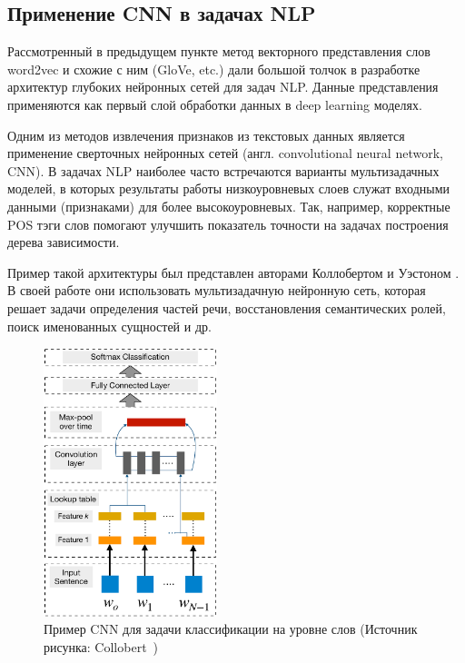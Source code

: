 \subsection{Применение CNN в задачах NLP}
Рассмотренный в предыдущем пункте метод векторного представления слов word2vec и схожие с ним (GloVe, etc.) дали большой толчок в разработке архитектур глубоких нейронных сетей для задач NLP. Данные представления применяются  как первый слой обработки данных в deep learning моделях. 

Одним из методов извлечения признаков из текстовых данных является применение сверточных нейронных сетей (англ. convolutional neural network, CNN).
В задачах NLP наиболее часто встречаются варианты мультизадачных моделей, в которых результаты работы низкоуровневых слоев служат входными данными (признаками) для более высокоуровневых. Так, например, корректные POS тэги слов помогают улучшить показатель точности на задачах построения дерева зависимости. 

Пример такой архитектуры был представлен авторами Коллобертом и Уэстоном \autocite{DBLP:journals/corr/abs-1103-0398}. В своей работе они использовать мультизадачную нейронную сеть, которая решает задачи определения частей речи, восстановления семантических ролей, поиск именованных сущностей и др. 

\begin{figure}[t]

\centering
\includegraphics[width=0.45\textwidth]{img/collobertCNN.pdf}
\caption{\label{fig:collobertCNN}Пример CNN для задачи классификации на уровне слов (Источник рисунка: Collobert~\autocite{DBLP:journals/corr/abs-1103-0398})}
\end{figure}

